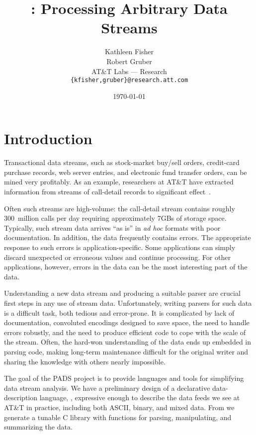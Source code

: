 \documentclass[10pt]{article}
\title{\vskip -1in \pads{}: Processing Arbitrary Data Streams}
\date{\today}
\author{
  Kathleen Fisher\\
  Robert Gruber\\
  AT\&T Labs --- Research \\
  \small\texttt{\{kfisher,gruber\}@research.att.com}
}
\begin{document}
\maketitle
\thispagestyle{empty}

\section{Introduction}
Transactional data streams, such as stock-market buy/sell orders,
credit-card purchase records, web server entries, and electronic fund
transfer orders, can be mined very profitably.  As an example,
researchers at AT\&T have extracted information from streams of
call-detail records to significant effect~\cite{kdd98,kdd99,kdd00}.   

Often such streams are high-volume: the call-detail stream contains
roughly 300~million calls per day requiring approximately 7GBs of
storage space.  Typically, such stream data arrives ``as is'' in
\textit{ad hoc} formats with poor documentation.  In addition, the
data frequently contains errors.  The appropriate response to such
errors is application-specific. Some applications can simply discard
unexpected or erroneous values and continue processing.  For other
applications, however, errors in the data can be the most interesting
part of the data.  

Understanding a new data stream and producing a suitable parser are
crucial first steps in any use of stream data.  Unfortunately, writing
parsers for such data is a difficult task, both tedious and
error-prone. It is complicated by lack of documentation, convoluted
encodings designed to save space, the need to handle errors
robustly, and the need to produce efficient code to cope with the
scale of the stream.  Often, the hard-won understanding of the data
ends up embedded in parsing code, making long-term maintenance
difficult for the original writer and sharing the knowledge with
others nearly impossible.

The goal of the PADS project is to provide languages and tools for
simplifying data stream analysis.  We have a preliminary design of a
declarative data-description language, \padsl{}, expressive enough to
describe the data feeds we see at AT\&T in practice, including both ASCII,
binary, and mixed data.  From \padsl{} we generate a tunable C library with
functions for parsing, manipulating, and summarizing the data.  
\end{document}
